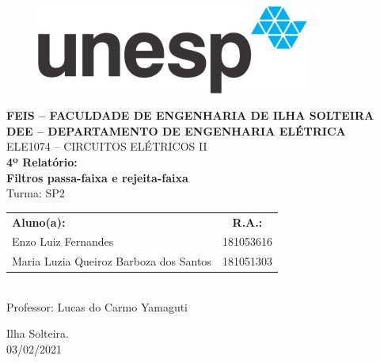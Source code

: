 \begin{titlepage}
	\begin{center} %
		{\begin{figure}[ht]
				\centering
				\includegraphics[width=9cm]{images/logoUNESP.jpg}
			\end{figure}}
		{\bf \large FEIS – FACULDADE DE ENGENHARIA DE ILHA SOLTEIRA}\\[0.2cm] %
		{\bf \large DEE – DEPARTAMENTO DE ENGENHARIA ELÉTRICA}\\[3.5cm]

		{\large ELE1074 – CIRCUITOS ELÉTRICOS II}\\[4.1cm]

		{\bf \huge 4º Relatório:}\\[0.2cm] %

		{\bf \huge Filtros passa-faixa e rejeita-faixa}\\[4.1cm]

		{\large Turma: SP2}\\[0.5cm]

		{\begin{tabular}{l c}
			\large\textbf{Aluno(a):}                      & \large\textbf{R.A.:}
			\\
			\Large Enzo Luiz Fernandes                    & \large 181053616     \\
			\Large Maria Luzia Queiroz Barboza dos Santos & \large 181051303
			\\
		\end{tabular}}\\[1cm]

		{\large Professor: Lucas do Carmo Yamaguti}\\[1.1cm]

	\end{center} %



	\begin{center}
		{\large Ilha Solteira.}\\[0.2cm]

		{\large 03/02/2021}

	\end{center}
\end{titlepage}